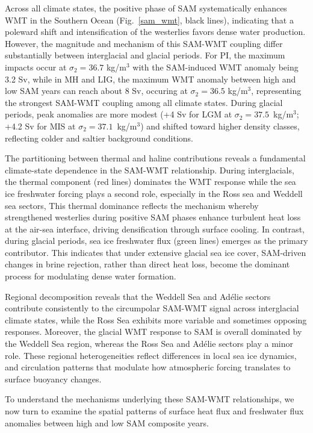 \documentclass[draft]{agujournal2025}
\begin{document}
Across all climate states, the positive phase of SAM systematically enhances WMT in the Southern Ocean (Fig.~\ref{sam_wmt}, black lines), indicating that a poleward shift and intensification of the westerlies favors dense water production. However, the magnitude and mechanism of this SAM-WMT coupling differ substantially between interglacial and glacial periods. For PI, the maximum impacts occur at $\sigma_2 = 36.7$ kg/m$^3$ with the SAM-induced WMT anomaly being 3.2 Sv,  while in MH and LIG, the maximum WMT anomaly between high and low SAM years can reach about 8 Sv, occuring at $\sigma_2 = 36.5$ kg/m$^3$, representing the strongest SAM-WMT coupling among all climate states. During glacial periods, peak anomalies are more modest (+4 Sv for LGM at $\sigma_2 = 37.5$~kg/m$^3$; +4.2 Sv for MIS at $\sigma_2 = 37.1$~kg/m$^3$) and shifted  toward higher density classes, reflecting colder and saltier background conditions.

The partitioning between thermal and haline contributions reveals a fundamental  climate-state dependence in the SAM-WMT relationship. During interglacials, the thermal component (red lines) dominates the WMT response while the sea ice freshwater forcing plays a second role, especially in the Ross sea and Weddell sea sectors,  This thermal dominance reflects the mechanism whereby strengthened westerlies during positive SAM phases enhance turbulent heat loss at the air-sea interface, driving densification through surface cooling. In contrast, during glacial periods, sea ice freshwater flux (green lines) emerges as the primary contributor. This indicates that under extensive glacial sea ice cover, SAM-driven changes in brine rejection, rather than direct heat loss, become the dominant process for modulating dense water formation.

Regional decomposition reveals that the Weddell Sea and Ad\'elie sectors contribute consistently to the circumpolar SAM-WMT signal across interglacial climate states, while the Ross Sea exhibits more variable and sometimes opposing responses. Moreover, the glacial WMT response to SAM is overall dominated by the Weddell Sea region, whereas the Ross Sea and Ad\'elie sectors play a minor role. These regional  heterogeneities reflect differences in local sea ice dynamics, and circulation patterns that modulate how atmospheric forcing translates to surface
  buoyancy changes.


To understand the mechanisms underlying these SAM-WMT relationships, we now turn to examine the spatial patterns of surface heat flux and freshwater flux anomalies between high and low SAM composite years.
\end{document}
